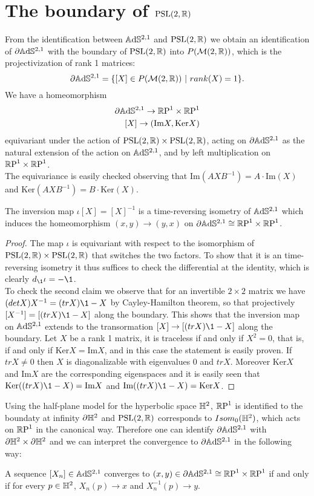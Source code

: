 \section{The boundary of $\PSL$}
From the identification between $\A^{2,1}$ and $\PSL$ we obtain an identification of $\partial \A^{2,1}$ with the boundary of $\PSL$ into $P(\mathcal{M}(2,\R))$, which is the projectivization of rank 1 matrices:
\[
    \partial \A^{2,1} = \{ [X] \in P(\mathcal{M}(2,\R)) \ | \ rank(X)=1 \}.
\]
We have a homeomorphism
\begin{align}
    \partial \A^{2,1} \to \T \\
    [X] \to (\text{Im}X, \text{Ker}X)
\end{align}
equivariant under the action of $\PSL \times \PSL$, acting on $\partial\A^{2,1}$ as the natural extension of the action on $\A^{2,1}$, and by left multiplication on $\T$.\\
The equivariance is easily checked observing that $\text{Im}(AXB^{-1}) = A \cdot \text{Im}(X)$ and $\text{Ker}(AXB^{-1}) = B \cdot \text{Ker}(X)$.
\begin{lemma}
    The inversion map $\iota [X] = [X]^{-1}$ is a time-reversing isometry of $\A^{2,1}$ which induces the homeomorphism $(x,y) \to (y,x)$ on $\partial \A^{2,1} \cong \T$.
\end{lemma}
\begin{proof}
    The map $\iota$ is equivariant with respect to the isomorphism of $\PSL \times \PSL$ that switches the two factors.
    To show that it is an time-reversing isometry it thus suffices to check the differential at the identity, which is clearly $d_\1 \iota = -\1$.\\
    To check the second claim we observe that for an invertible $2 \times 2$ matrix we have $(detX)X^{-1} = (trX)\1 - X$ by Cayley-Hamilton theorem, so that projectively $[X^{-1}]=[(trX) \1 - X]$ along the boundary.
    This shows that the inversion map on $\A^{2,1}$ extends to the transormation $[X] \to [(trX)\1 - X]$ along the boundary.
    Let $X$ be a rank 1 matrix, it is traceless if and only if $X^2 =0$, that is, if and only if $\text{Ker}X=\text{Im}X$, and in this case the statement is easily proven.
    If $trX \neq 0$ then $X$ is diagonalizable with eigenvalues $0$ and $trX$. Moreover $\text{Ker}X$ and $\text{Im}X$ are the corresponding eigenspaces and it is easily seen that $\text{Ker}((trX)\1 -X) = \text{Im}X$ and $\text{Im}((trX)\1 -X) = \text{Ker}X$.
\end{proof}

Using the half-plane model for the hyperbolic space $\H^2$, $\S$ is identified to the boundaty at infinity $\partial \H^2$ and $\PSL$ corresponds to $Isom_0(\H^2)$, which acts on $\S$ in the canonical way.
Therefore one can identify $\partial \A^{2,1}$ with $\partial \H^2 \times \partial \H^2$ and we can interpret the convergence to $\partial \A^{2,1}$ in the following way:
\begin{lemma}
    A sequence $[X_n] \in \A^{2,1}$ converges to $(x,y) \in \partial \A^{2,1} \cong \T$ if and only if for every $p\in\H^2$, $X_n(p) \to x$ and $X_n^{-1}(p) \to y$.
\end{lemma}

